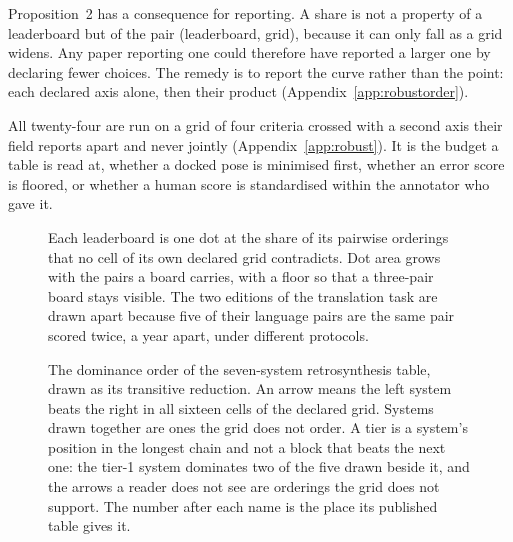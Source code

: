 \documentclass{article}
\begin{document}
Proposition~2 has a consequence for reporting. A share is not a property of a leaderboard but of the
pair (leaderboard, grid), because it can only fall as a grid widens. Any paper reporting one could
therefore have reported a larger one by declaring fewer choices. The remedy is to report the curve
rather than the point: each declared axis alone, then their product
(Appendix~\ref{app:robustorder}).

All twenty-four are run on a grid of four criteria crossed with a second axis their field
reports apart and never jointly (Appendix~\ref{app:robust}). It is the budget a table is read at,
whether a docked pose is minimised first, whether an error score is floored, or whether a human
score is standardised within the annotator who gave it.

\begin{figure}[t]
\centering

\caption{Each leaderboard is one dot at the share of its pairwise orderings that no cell of its own
declared grid contradicts. Dot area grows with the pairs a board carries, with a floor so that a three-pair board stays visible. The two
editions of the translation task are drawn apart because five of their language pairs are the
same pair scored twice, a year apart, under different protocols.}
\label{fig:shares}
\end{figure}

\begin{figure}[t]
\centering

\caption{The dominance order of the seven-system retrosynthesis table, drawn as its transitive reduction.
An arrow means the left system beats the right in all sixteen cells of the declared grid. Systems
drawn together are ones the grid does not order. A tier is a system's position in the longest
chain and not a block that beats the next one: the tier-1 system dominates two of the five drawn
beside it, and the arrows a reader does not see are orderings the grid does not support. The
number after each name is the place its published table gives it.}
\label{fig:hasse}
\end{figure}
\end{document}
